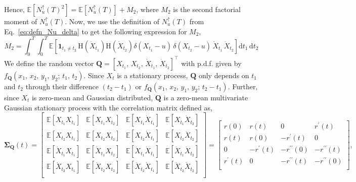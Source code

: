 \documentclass[journal]{IEEEtran}
\theoremstyle{plain}
\theoremstyle{definition}
\theoremstyle{remark}
\newcommand{\E}{\mathbb{E}}
\newcommand{\Nup}{N_u^{\uparrow}(T)}
\newcommand{\dd}{\mathrm{d}}
\newcommand{\rp}{r^\prime}
\newcommand{\rpp}{r^{\prime\prime}}
\begin{document}
Hence, $\E\left[\Nup^2\right] = \E\left[\Nup\right] + M_2$, where $M_2$ is the second factorial moment of $\Nup$. Now, we use the definition of $\Nup$ from Eq.~\eqref{eq:defn_Nu_delta} to get the following expression for $M_2$,
\begin{equation}
    M_2 = \int_0^T \int_0^T \E\left[\mathbf{1}_{t_1\neq t_2} \, \mathrm{H}\left(\dot{X}_{t_1}\right) \mathrm{H}\left(\dot{X}_{t_2}\right)
    \delta\left(X_{t_1} - u\right) \, \delta\left(X_{t_2} - u\right) \, \dot{X}_{t_1} \, \dot{X}_{t_2} \right] \dd t_1 \, \dd t_2 \label{eq:I_rice_variance}
\end{equation}
We define the random vector $\mathbf{Q} = [X_{t_1}, \, X_{t_2}, \, \dot{X}_{t_1}, \, \dot{X}_{t_2}]^\top$ with p.d.f. given by $f_{\mathbf{Q}}(x_1, \,x_2, \,y_1, \,y_2; \,t_1, \,t_2)$. Since $X_{t}$ is a stationary process, $\mathbf{Q}$ only depends on $t_1$ and $t_2$ through their difference $\left(t_2-t_1\right)$ or $f_{\mathbf{Q}}(x_1, \,x_2, \,y_1, \,y_2;\,t_2 - t_1)$. Further, since $X_{t}$ is zero-mean and Gaussian distributed, $\mathbf{Q}$ is a zero-mean multivariate Gaussian stationary process with the correlation matrix defined as,
\begin{equation}
\renewcommand{\arraystretch}{1.5}
    \boldsymbol{\Sigma}_{\mathbf{Q}}(t) = \begin{bmatrix}
                \E[X_{t_1} X_{t_1} ] & \E[X_{t_1} X_{t_2} ] & \E[X_{t_1} \dot{X}_{t_1} ] & \E[X_{t_1} \dot{X}_{t_2} ] \\
                \E[X_{t_2} X_{t_1} ] & \E[X_{t_2} X_{t_2} ] & \E[X_{t_2} \dot{X}_{t_1} ] & \E[X_{t_2} \dot{X}_{t_2} ] \\
                \E[\dot{X}_{t_1} X_{t_1} ] & \E[\dot{X}_{t_1} X_{t_2} ] & \E[\dot{X}_{t_1} \dot{X}_{t_1} ] & \E[\dot{X}_{t_1} \dot{X}_{t_2} ] \\
                \E[\dot{X}_{t_2} X_{t_1} ] & \E[\dot{X}_{t_2} X_{t_2} ] & \E[\dot{X}_{t_2} \dot{X}_{t_1} ] & \E[\dot{X}_{t_2} \dot{X}_{t_2} ] \\
                \end{bmatrix} = 
                \begin{bmatrix}
                r(0) & r(t) & 0 & \rp(t) \\
                r(t) & r(0) & -\rp(t) & 0 \\
                0 & -\rp(t) & -\rpp(0) & -\rpp(t) \\
                \rp(t) & 0 & -\rpp(t) & -\rpp(0) \\
                \end{bmatrix}, \label{eq:correlation_mat_Q}
\end{equation}
\end{document}
